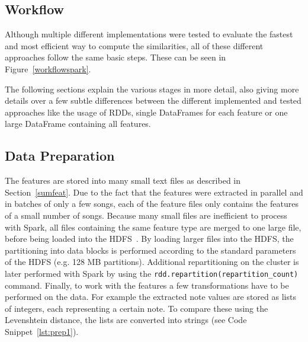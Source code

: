 \subsection{Workflow}

Although multiple different implementations were tested to evaluate the fastest and most efficient way to compute the similarities, all of these different approaches follow the same basic steps. These can be seen in Figure~\ref{workflowspark}.  

\begin{figure}[htbp]
	\centering
\end{figure}
\FloatBarrier

\noindent The following sections explain the various stages in more detail, also giving more details over a few subtle differences between the different implemented and tested approaches like the usage of RDDs, single DataFrames for each feature or one large DataFrame containing all features. 

\subsection{Data Preparation}

The features are stored into many small text files as described in Section~\ref{sumfeat}. Due to the fact that the features were extracted in parallel and in batches of only a few songs, each of the feature files only contains the features of a small number of songs. Because many small files are inefficient to process with Spark, all files containing the same feature type are merged to one large file, before being loaded into the HDFS~\cite[p. 153]{sparkbook1}. By loading larger files into the HDFS, the partitioning into data blocks is performed according to the standard parameters of the HDFS (e.g. 128 MB partitions). Additional repartitioning on the cluster is later performed with Spark by using the \lstinline{rdd.repartition(repartition_count)} command. 
Finally, to work with the features a few transformations have to be performed on the data. For example the extracted note values are stored as lists of integers, each representing a certain note. To compare these using the Levenshtein distance, the lists are converted into strings (see Code Snippet~\ref{lst:prep1}). 

